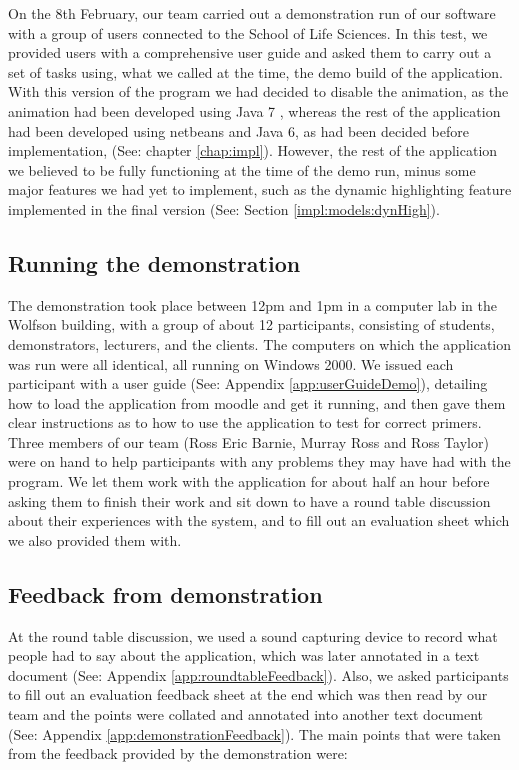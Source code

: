 On the 8th February, our team carried out a demonstration run of our software with a group of users connected to the School of Life Sciences. In this test, we provided users with a comprehensive user guide and asked them to carry out a set of tasks using, what we called at the time, the demo build of the application. With this version of the program we had decided to disable the animation, as the animation had been developed using Java 7 \cite{Java7SwingAPI}, whereas the rest of the application had been developed using netbeans and Java 6, as had been decided before implementation, (See: chapter \ref{chap:impl}). However, the rest of the application we believed to be fully functioning at the time of the demo run, minus some major features we had yet to implement, such as the dynamic highlighting feature implemented in the final version (See: Section \ref{impl:models:dynHigh}).

\subsection{Running the demonstration}

The demonstration took place between 12pm and 1pm in a computer lab in the Wolfson building, with a group of about 12 participants, consisting of students, demonstrators, lecturers, and the clients. The computers on which the application was run were all identical, all running on Windows 2000. We issued each participant with a user guide (See: Appendix \ref{app:userGuideDemo}), detailing how to load the application from moodle and get it running, and then gave them clear instructions as to how to use the application to test for correct primers. Three members of our team (Ross Eric Barnie, Murray Ross and Ross Taylor) were on hand to help participants with any problems they may have had with the program. We let them work with the application for about half an hour before asking them to finish their work and sit down to have a round table discussion about their experiences with the system, and to fill out an evaluation sheet which we also provided them with.

\subsection{Feedback from demonstration}

At the round table discussion, we used a sound capturing device to record what people had to say about the application, which was later annotated in a text document (See: Appendix \ref{app:roundtableFeedback}). Also, we asked participants to fill out an evaluation feedback sheet at the end which was then read by our team and the points were collated and annotated into another text document (See: Appendix \ref{app:demonstrationFeedback}). The main points that were taken from the feedback provided by the demonstration were:

